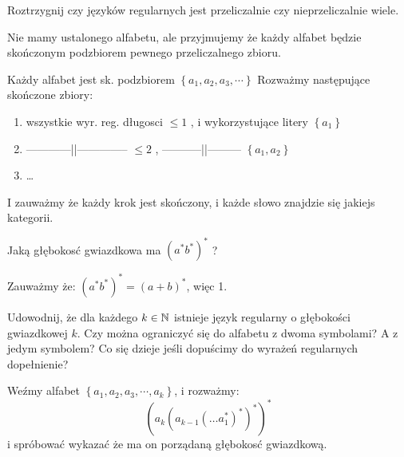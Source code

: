 \documentclass[11pt]{scrartcl}
\begin{document}
  \begin{zadanie}
      Roztrzygnij czy języków regularnych jest przeliczalnie czy nieprzeliczalnie wiele.
      \begin{uwaga}
          Nie mamy ustalonego alfabetu, ale przyjmujemy że każdy alfabet będzie skończonym podzbiorem pewnego przeliczalnego zbioru.
      \end{uwaga}
  \end{zadanie}

  Każdy alfabet jest sk. podzbiorem $\left \{ a_{1}, a_{2}, a_{3}, \cdots  \right \}$
  Rozważmy następujące skończone zbiory:
  \begin{enumerate}
      \item wszystkie wyr. reg. długosci $\leq 1$ , i wykorzystujące litery $\left \{ a_{1} \right \}$
      \item ------------||-------------- $\leq 2$ , -----------||--------- $\left \{ a_{1}, a_{2} \right \}$
      \item \dots 
  \end{enumerate}
  
  I zauważmy że każdy krok jest skończony, i każde słowo znajdzie się jakiejs kategorii.

  \begin{przykład}
      Jaką głębokosć gwiazdkowa ma $\left ( a^* b^* \right )^*$ ?
  \end{przykład}
  
  Zauważmy że: $\left ( a^* b^* \right )^* = (a+b)^*$, więc 1.

  \begin{zadanie}
      Udowodnij, że dla każdego $k \in \mathbb N$ istnieje język regularny o głębokości gwiazdkowej $k$. Czy można ograniczyć się do alfabetu z dwoma symbolami? A z jedym symbolem? Co się dzieje jeśli dopuścimy do wyrażeń regularnych dopełnienie?
  \end{zadanie}

  Weźmy alfabet $\left \{ a_{1}, a_{2}, a_{3}, \cdots , a_{k} \right \}$, i rozważmy:
  \[
    \left ( a_k \left ( a_{k-1} \left ( \dots a_{1}^* \right )^* \right )^* \right )^*
  \]
  i spróbować wykazać że ma on porządaną głębokosć gwiazdkową.
\end{document}
